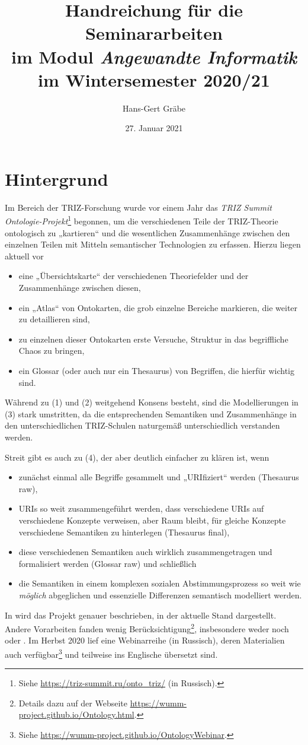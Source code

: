 \documentclass[11pt,a4paper]{article}
\title{Handreichung für die Seminararbeiten\\ im Modul \emph{Angewandte
    Informatik}\\ im Wintersemester 2020/21}
\author{Hans-Gert Gr\"abe}
\date{27. Januar 2021}
\begin{document}
\maketitle

\section{Hintergrund}

Im Bereich der TRIZ-Forschung wurde vor einem Jahr das \emph{TRIZ Summit
  Ontologie-Projekt}\footnote{Siehe \url{https://triz-summit.ru/onto_triz/}
  (in Russisch).}  begonnen, um die verschiedenen Teile der TRIZ-Theorie
ontologisch zu „kartieren“ und die wesentlichen Zusammenhänge zwischen den
einzelnen Teilen mit Mitteln semantischer Technologien zu erfassen. Hierzu
liegen aktuell vor
\begin{itemize}[noitemsep]
\item[(1)] eine „Übersichtskarte“ der verschiedenen Theoriefelder und der
  Zusammenhänge zwischen diesen,
\item[(2)] ein „Atlas“ von Ontokarten, die grob einzelne Bereiche markieren,
  die weiter zu detaillieren sind,
\item[(3)] zu einzelnen dieser Ontokarten erste Versuche, Struktur in das
  begriff\-liche Chaos zu bringen,
\item[(4)] ein Glossar (oder auch nur ein Thesaurus) von Begriffen, die
  hierfür wichtig sind.
\end{itemize}

Während zu (1) und (2) weitgehend Konsens besteht, sind die Modellierungen in
(3) stark umstritten, da die entsprechenden Semantiken und Zusammenhänge in
den unterschiedlichen TRIZ-Schulen naturgemäß unterschiedlich verstanden
werden.

Streit gibt es auch zu (4), der aber deutlich einfacher zu klären ist, wenn 
\begin{itemize}[noitemsep]
\item[(4a)] zunächst einmal alle Begriffe gesammelt und „URIfiziert“ werden
  (Thesaurus raw),
\item[(4b)] URIs so weit zusammengeführt werden, dass verschiedene URIs auf
  verschiedene Konzepte verweisen, aber Raum bleibt, für gleiche Konzepte
  verschiedene Semantiken zu hinterlegen (Thesaurus final),
\item[(4c)] diese verschiedenen Semantiken auch wirklich zusammengetragen und
  formalisiert werden (Glossar raw) und schließlich
\item[(4d)] die Semantiken in einem komplexen sozialen Abstimmungsprozess so
  weit wie \emph{möglich} abgeglichen und essenzielle Differenzen semantisch
  modelliert werden. 
\end{itemize}
In \cite{Kuryan2019} wird das Projekt genauer beschrieben, in
\cite{Kuryan2020} der aktuelle Stand dargestellt. Andere Vorarbeiten fanden
wenig Berücksichtigung\footnote{Details dazu auf der Webseite
  \url{https://wumm-project.github.io/Ontology.html}.}, insbesondere weder
\cite{IDM2011} noch \cite{GSA} oder \cite{VDI}. Im Herbst 2020 lief eine
Webinarreihe (in Russisch), deren Materialien auch verfügbar\footnote{Siehe
  \url{https://wumm-project.github.io/OntologyWebinar}.} und teilweise ins
Englische übersetzt sind.
\end{document}
